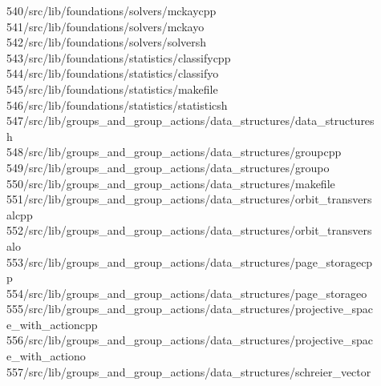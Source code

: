 \begin{tabbing}
540\>/src/lib/foundations/solvers/mckaycpp\\[0pt]
541\>/src/lib/foundations/solvers/mckayo\\[0pt]
542\>/src/lib/foundations/solvers/solversh\\[0pt]
543\>/src/lib/foundations/statistics/classifycpp\\[0pt]
544\>/src/lib/foundations/statistics/classifyo\\[0pt]
545\>/src/lib/foundations/statistics/makefile\\[0pt]
546\>/src/lib/foundations/statistics/statisticsh\\[0pt]
547\>/src/lib/groups\_and\_group\_actions/data\_structures/data\_structures\\[0pt]
\>h\\[0pt]
548\>/src/lib/groups\_and\_group\_actions/data\_structures/groupcpp\\[0pt]
549\>/src/lib/groups\_and\_group\_actions/data\_structures/groupo\\[0pt]
550\>/src/lib/groups\_and\_group\_actions/data\_structures/makefile\\[0pt]
551\>/src/lib/groups\_and\_group\_actions/data\_structures/orbit\_transvers\\[0pt]
\>alcpp\\[0pt]
552\>/src/lib/groups\_and\_group\_actions/data\_structures/orbit\_transvers\\[0pt]
\>alo\\[0pt]
553\>/src/lib/groups\_and\_group\_actions/data\_structures/page\_storagecp\\[0pt]
\>p\\[0pt]
554\>/src/lib/groups\_and\_group\_actions/data\_structures/page\_storageo\\[0pt]
555\>/src/lib/groups\_and\_group\_actions/data\_structures/projective\_spac\\[0pt]
\>e\_with\_actioncpp\\[0pt]
556\>/src/lib/groups\_and\_group\_actions/data\_structures/projective\_spac\\[0pt]
\>e\_with\_actiono\\[0pt]
557\>/src/lib/groups\_and\_group\_actions/data\_structures/schreier\_vector\\[0pt]

\end{tabbing}

